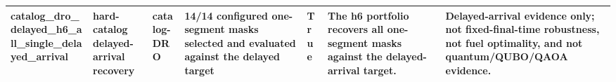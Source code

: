 \begin{tabular}{lllllll}
catalog\_dro\_delayed\_h6\_all\_single\_delayed\_arrival & hard-catalog delayed-arrival recovery & catalog-DRO & 14/14 configured one-segment masks selected and evaluated against the delayed target & True & The h6 portfolio recovers all one-segment masks against the delayed-arrival target. & Delayed-arrival evidence only; not fixed-final-time robustness, not fuel optimality, and not quantum/QUBO/QAOA evidence. \\
\bottomrule
\end{tabular}
